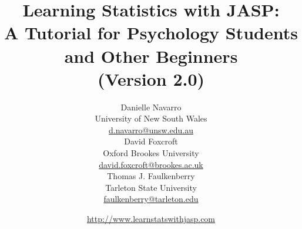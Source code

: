 


\date{\url{http://www.learnstatswithjasp.com} \hfill \\ }
\title{Learning Statistics with JASP:\\ A Tutorial for Psychology Students and Other Beginners \vspace*{18pt}
\\ (Version 2.0) \\ \vspace*{24pt}}
\author{Danielle Navarro \\ University of New South Wales \\ \url{d.navarro@unsw.edu.au} \vspace*{18pt} \\
David Foxcroft \\ Oxford Brookes University \\ \url{david.foxcroft@brookes.ac.uk} \vspace*{18pt} \\
Thomas J. Faulkenberry \\ Tarleton State University \\ \url{faulkenberry@tarleton.edu}\vspace*{36pt}}


 
